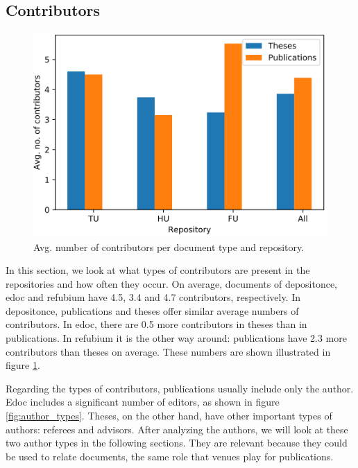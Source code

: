 \subsection{Contributors} \label{repo_analysis_contributors}

\begin{figure}
    \centering
    \includegraphics[width=.7\textwidth]{figures/repository_analysis/avg_contributors.PNG}
    \caption{Avg. number of contributors per document type and repository.}
    \label{fig:avg_contributors}
\end{figure}

In this section, we look at what types of contributors are present in the repositories and how often they occur. On average, documents of depositonce, edoc and refubium have 4.5, 3.4 and 4.7 contributors, respectively. In depositonce, publications and theses offer similar average numbers of contributors. In edoc, there are 0.5 more contributors in theses than in publications. In refubium it is the other way around: publications have 2.3 more contributors than theses on average. These numbers are shown illustrated in figure \ref{fig:avg_contributors}.

Regarding the types of contributors, publications usually include only the author. Edoc includes a significant number of editors, as shown in figure \ref{fig:author_types}. Theses, on the other hand, have other important types of authors: referees and advisors. After analyzing the authors, we will look at these two author types in the following sections. They are relevant because they could be used to relate documents, the same role that venues play for publications.


